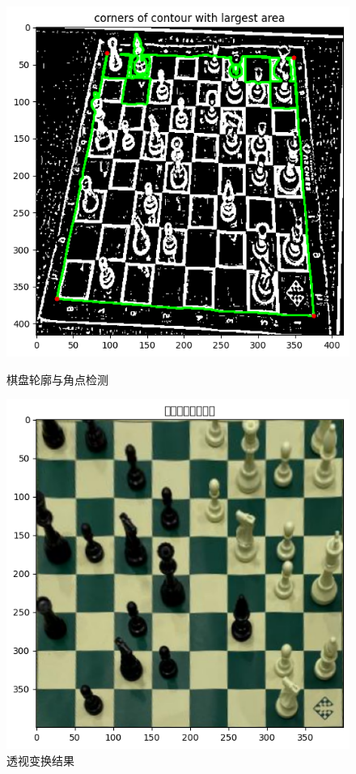 \documentclass[12pt, a4paper]{article}
\begin{document}
\begin{figure}[h!]
    \centering
    \begin{minipage}{0.48\textwidth}
        \centering
        \includegraphics[width=\linewidth]{image/corners_of_contour_with_largest_area.png} %
        \caption{棋盘轮廓与角点检测}
        \label{fig:corners}
    \end{minipage}\hfill
    \begin{minipage}{0.48\textwidth}
        \centering
        \includegraphics[width=\linewidth]{image/transform.png} %
        \caption{透视变换结果}
        \label{fig:warped}
    \end{minipage}
\end{figure}
\end{document}
